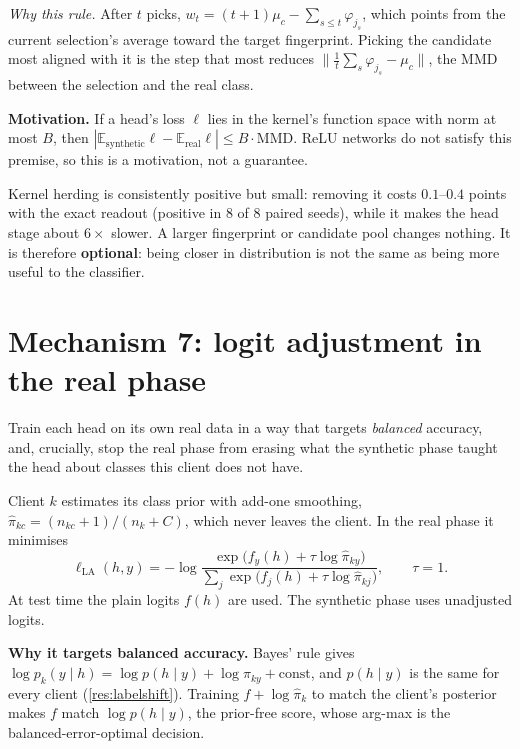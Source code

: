 \documentclass[11pt]{article}
\theoremstyle{plain}
\theoremstyle{definition}
\newcommand{\E}{\mathbb{E}}
\newcommand{\norm}[1]{\lVert #1\rVert}
\begin{document}
\emph{Why this rule.} After $t$ picks, $w_t=(t+1)\mu_c-\sum_{s\le t}\varphi_{j_s}$, which points from the current
selection's average toward the target fingerprint. Picking the candidate most aligned with it is the step that most
reduces $\norm{\frac1t\sum_s\varphi_{j_s}-\mu_c}$, the MMD between the selection and the real class.

\textbf{Motivation.} If a head's loss $\ell$ lies in the kernel's function space with norm at most $B$, then
$|\E_{\text{synthetic}}\ell-\E_{\text{real}}\ell|\le B\cdot\mathrm{MMD}$. ReLU networks do not satisfy this premise, so
this is a motivation, not a guarantee.

\begin{keypoint}
Kernel herding is consistently positive but small: removing it costs $0.1$--$0.4$ points with the exact readout
(positive in 8 of 8 paired seeds), while it makes the head stage about $6\times$ slower. A larger fingerprint or
candidate pool changes nothing. It is therefore \textbf{optional}: being closer in distribution is not the same as
being more useful to the classifier.
\end{keypoint}

\section{Mechanism 7: logit adjustment in the real phase}\label{sec:la}

\begin{purpose}
Train each head on its own real data in a way that targets \emph{balanced} accuracy, and, crucially, stop the real
phase from erasing what the synthetic phase taught the head about classes this client does not have.
\end{purpose}

\begin{steps}
Client $k$ estimates its class prior with add-one smoothing, $\hat\pi_{kc}=(n_{kc}+1)/(n_k+C)$, which never leaves
the client. In the real phase it minimises
\[
\ell_{\mathrm{LA}}(h,y)=-\log\frac{\exp\big(f_y(h)+\tau\log\hat\pi_{ky}\big)}{\sum_j\exp\big(f_j(h)+\tau\log\hat\pi_{kj}\big)},
\qquad\tau=1 .
\]
At test time the plain logits $f(h)$ are used. The synthetic phase uses unadjusted logits.
\end{steps}

\textbf{Why it targets balanced accuracy.} Bayes' rule gives $\log p_k(y\mid h)=\log p(h\mid y)+\log\pi_{ky}+\text{const}$,
and $p(h\mid y)$ is the same for every client (\cref{res:labelshift}). Training $f+\log\hat\pi_k$ to match the client's
posterior makes $f$ match $\log p(h\mid y)$, the prior-free score, whose arg-max is the balanced-error-optimal decision.
\end{document}
